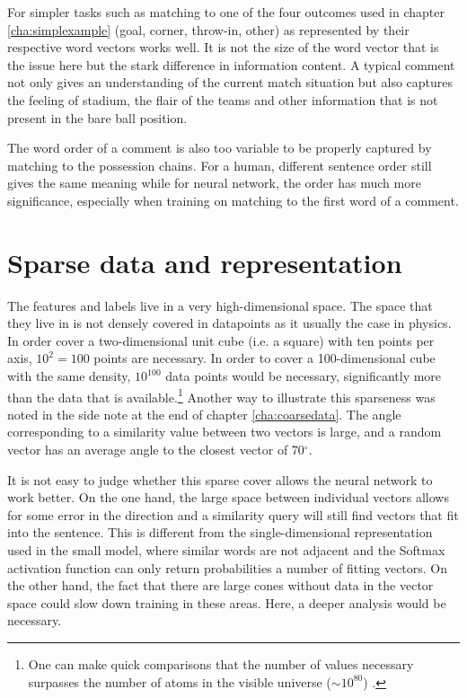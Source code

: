 \documentclass[10pt, a4paper]{UUThesisTemplate}
\begin{document}
For simpler tasks such as matching to one of the four outcomes used in chapter \ref{cha:simplexample} (goal, corner, throw-in, other) as represented by their respective word vectors works well. It is not the size of the word vector that is the issue here but the stark difference in information content. A typical comment not only gives an understanding of the current match situation but also captures the feeling of stadium, the flair of the teams and other information that is not present in the bare ball position.

The word order of a comment is also too variable to be properly captured by matching to the possession chains. For a human, different sentence order still gives the same meaning while for neural network, the order has much more significance, especially when training on matching to the first word of a comment.

\section{Sparse data and representation}

The features and labels live in a very high-dimensional space. The space that they live in is not densely covered in datapoints as it usually the case in physics. In order cover a two-dimensional unit cube (i.e. a square) with ten points per axis, $10^2 = 100$ points are necessary. In order to cover a 100-dimensional cube with the same density, $10^{100}$ data points would be necessary, significantly more than the data that is available.\footnote{One can make quick comparisons that the number of values necessary surpasses the number of atoms in the visible universe ($\sim 10^{80}$) \cite{obsuniverse}.} Another way to illustrate this sparseness was noted in the side note at the end of chapter \ref{cha:coarsedata}. The angle corresponding to a similarity value between two vectors is large, and a random vector has an average angle to the closest vector of 70${}^\circ$.

It is not easy to judge whether this sparse cover allows the neural network to work better. On the one hand, the large space between individual vectors allows for some error in the direction and a similarity query will still find vectors that fit into the sentence. This is different from the single-dimensional representation used in the small model, where similar words are not adjacent and the Softmax activation function can only return probabilities a number of fitting vectors. On the other hand, the fact that there are large cones without data in the vector space could slow down training in these areas. Here, a deeper analysis would be necessary.
\end{document}

